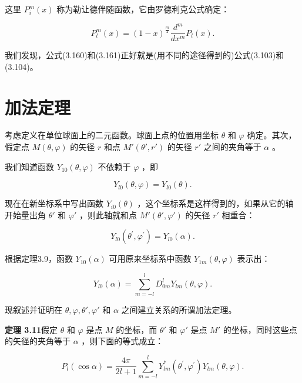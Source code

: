 这里 $P_{i}^{m}(x)$ 称为勒让德伴随函数，它由罗德利克公式确定：

\begin{equation*}
P _ {l} ^ {m} (x) = (1 - x) ^ {\frac {m}{2}} \frac {d ^ {m}}{d x ^ {m}} P _ {l} (x).\tag{3.161}
\end{equation*}

我们发现，公式(3.160)和(3.161)正好就是(用不同的途径得到的)公式(3.103)和(3.104)。

\section{加法定理}

考虑定义在单位球面上的二元函数。球面上点的位置用坐标 $\theta$ 和 $\varphi$ 确定。其次，假定点 $M(\theta, \varphi)$ 的矢径 $r$ 和点 $M'(\theta', r')$ 的矢径 $r'$ 之间的夹角等于 $\alpha$ 。

我们知道函数 $Y_{10}(\theta, \varphi)$ 不依赖于 $\varphi$ ，即

\begin{equation*}
Y _ {l 0} (\theta , \varphi) = Y _ {l 0} (\theta).
\end{equation*}

现在在新坐标系中写出函数 $Y_{i0}(\theta)$ ，这个坐标系是这样得到的，如果从它的轴开始量出角 $\theta'$ 和 $\varphi'$ ，则此轴就和点 $M'(\theta',\varphi')$ 的矢径 $r'$ 相重合：

\begin{equation*}
Y _ {l 0} \left(\theta^ {\prime}, \varphi^ {\prime}\right) = Y _ {l 0} (\alpha).
\end{equation*}

根据定理3.9，函数 $Y_{10}(\alpha)$ 可用原来坐标系中函数 $Y_{1m}(\theta, \varphi)$ 表示出：

\begin{equation*}
Y _ {l 0} (\alpha) = \sum_ {m = - l} ^ {l} D _ {0 m} ^ {l} Y _ {l m} (\theta , \varphi).\tag{3.162}
\end{equation*}

现叙述并证明在 $\theta, \varphi, \theta', \varphi'$ 和 $\alpha$ 之间建立关系的所谓加法定理。

\textbf{定理 3.11}\quad 假定 $\theta$ 和 $\varphi$ 是点 $M$ 的坐标，而 $\theta'$ 和 $\varphi'$ 是点 $M'$ 的坐标，同时这些点的矢径的夹角等于 $\alpha$ ，则下面的等式成立：

\begin{equation*}
P _ {l} (\cos \alpha) = \frac {4 \pi}{2 l + 1} \sum_ {m = - l} ^ {l} Y _ {l m} ^ {*} \left(\theta^ {\prime}, \varphi^ {\prime}\right) Y _ {l m} (\theta , \varphi).\tag{3.163}
\end{equation*}

